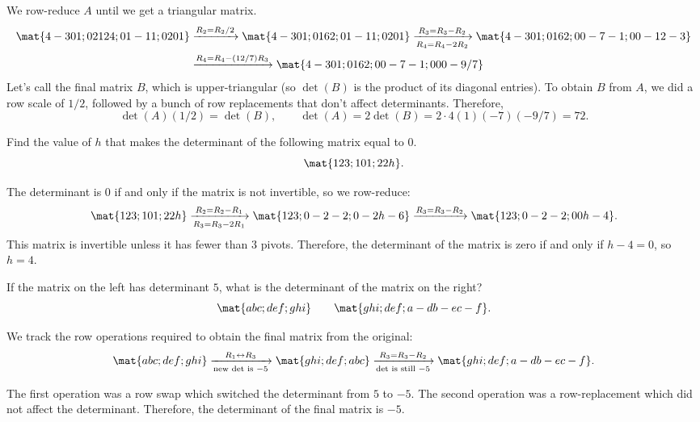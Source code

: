 \begin{problems}
\begin{solution} We row-reduce $A$ until we get a triangular matrix.
\begin{align*}
  \mat{4 -3 0 1; 0 2 12 4; 0 1 -1 1; 0 2 0 1}
  & \xrightarrow[]{R_2= R_2/2} \mat{4 -3 0 1; 0 1 6 2; 0 1 -1 1; 0 2 0 1}
  \xrightarrow[R_4 = R_4-2R_2]{R_3 = R_3-R_2} %
    \mat{4 -3 0 1; 0 1 6 2; 0 0 -7 -1; 0 0 -12 -3} \\
  & \xrightarrow[]{R_4 = R_4 - (12/7)R_3}
    \mat{4 -3 0 1; 0 1 6 2; 0 0 -7 -1; 0 0 0 -9/7}
\end{align*}
Let's call the final matrix $B$, which is upper-triangular (so $\det(B)$ is the
product of its diagonal entries).  To obtain $B$ from $A$, we did a row scale of
$1/2$, followed by a bunch of row replacements that don't affect determinants.
Therefore,
\[\det(A)(1/2) = \det(B), \qquad \det(A)= 2 \det(B) = 2 \cdot 4(1)(-7)(-9/7) = 72.\]
\end{solution}

\problem %
Find the value of $h$ that makes the determinant of the following matrix equal to $0$.
\[\mat{1 2 3; 1 0 1; 2 2 h}.\]

\begin{solution}
The determinant is $0$ if and only if the matrix is not invertible, so we row-reduce:
\[
  \mat{1 2 3; 1 0 1; 2 2 h}
  \xrightarrow[R_3 = R_3 - 2R_1]{R_2 = R_2 - R_1}
    \mat{1 2 3; 0 -2 -2; 0 -2 h-6}
  \xrightarrow[]{R_3 = R_3 - R_2}
    \mat{1 2 3; 0 -2 -2; 0 0 h-4}.
\]
This matrix is invertible unless it has fewer than $3$ pivots.  Therefore, the
determinant of the matrix is zero if and only if $h-4=0$, so $h=4$.
\end{solution}

\problem %
If the matrix on the left has determinant $5$, what is the determinant of the
matrix on the right?
\[\mat{a b c; d e f; g h i} \qquad
\mat{g h i; d e f; a-d b-e c-f}.\]

\begin{solution}
We track the row operations required to obtain the final matrix from the original:
\[\mat{a b c; d e f; g h i}
  \xrightarrow[\textup{new det is }-5]{R_1 \leftrightarrow R_3} \mat{g h i; d e f; a b c}
  \xrightarrow[\textup{det is still } -5]{R_3=R_3-R_2} \mat{g h i; d e f; a-d b-e c-f}.\]
\end{solution}
The first operation was a row swap which switched the determinant from $5$ to $-5$.
The second operation was a row-replacement which did not affect the determinant.
Therefore, the determinant of the final matrix is $-5$.




\end{problems}
